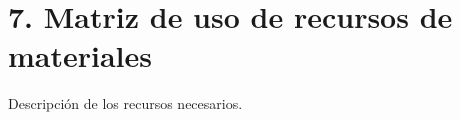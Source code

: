 \section{7. Matriz de uso de recursos de materiales}
\label{sec:recursos}

Descripción de los recursos necesarios.
